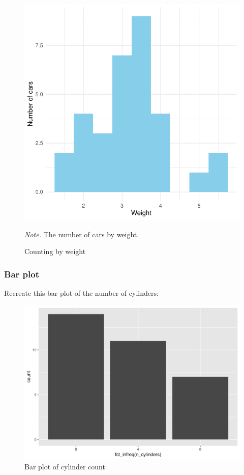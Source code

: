 \documentclass[
  man,
  floatsintext,
  longtable,
  nolmodern,
  notxfonts,
  notimes,
  colorlinks=true,linkcolor=blue,citecolor=blue,urlcolor=blue]{apa7}
\begin{document}
\begin{figure}[H]

{\caption{{Counting by weight}{\label{fig-plot1-histogram}}}}

\includegraphics{data-visualization_files/figure-pdf/fig-plot1-histogram-1.pdf}

{\noindent \emph{Note.} The number of cars by weight.}

\end{figure}

\subsubsection{Bar plot}\label{bar-plot}

Recreate this bar plot of the number of cylinders:

\begin{figure}[H]

\caption{Bar plot of cylinder count}

{\centering \includegraphics{plots/plot2.png}

}

\end{figure}%
\end{document}

